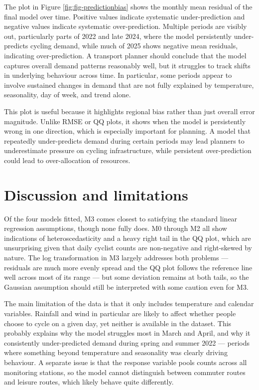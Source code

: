 \documentclass[
]{article}
\newcounter{none} %
\begin{document}
The plot in Figure \ref{fig:fig-predictionbias} shows the monthly mean residual of the final model over time. Positive values indicate systematic under-prediction and negative values indicate systematic over-prediction. Multiple periods are visibly out, particularly parts of 2022 and late 2024, where the model persistently under-predicts cycling demand, while much of 2025 shows negative mean residuals, indicating over-prediction. A transport planner should conclude that the model captures overall demand patterns reasonably well, but it struggles to track shifts in underlying behaviour across time. In particular, some periods appear to involve sustained changes in demand that are not fully explained by temperature, seasonality, day of week, and trend alone.

This plot is useful because it highlights regional bias rather than just overall error magnitude. Unlike RMSE or QQ plots, it shows when the model is persistently wrong in one direction, which is especially important for planning. A model that repeatedly under-predicts demand during certain periods may lead planners to underestimate pressure on cycling infrastructure, while persistent over-prediction could lead to over-allocation of resources.

\section{Discussion and limitations}\label{discussion-and-limitations}

Of the four models fitted, M3 comes closest to satisfying the standard linear regression assumptions, though none fully does. M0 through M2 all show indications of heteroscedasticity and a heavy right tail in the QQ plot, which are unsurprising given that daily cyclist counts are non-negative and right-skewed
by nature. The log transformation in M3 largely addresses both problems --- residuals are much more evenly spread and the QQ plot follows the reference line well across most of its range --- but some deviation remains at both tails, so the Gaussian assumption should still be interpreted with some caution even for M3.

The main limitation of the data is that it only includes temperature and calendar variables. Rainfall and wind in particular are likely to affect whether people choose to cycle on a given day, yet neither is available in the dataset. This probably explains why the model struggles most in March and April, and why it consistently under-predicted demand during spring and summer 2022 --- periods where something beyond temperature and seasonality was clearly
driving behaviour. A separate issue is that the response variable pools counts across all monitoring stations, so the model cannot distinguish between commuter routes and leisure routes, which likely behave quite differently.
\end{document}
